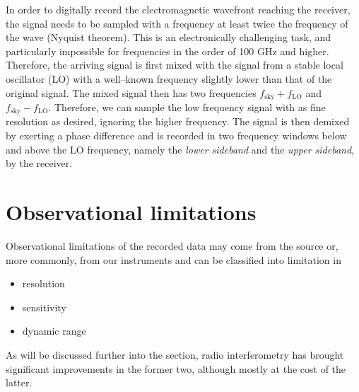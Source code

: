 \documentclass[a4wide,12pt]{book}
\begin{document}
{In order to digitally record the electromagnetic wavefront reaching the receiver, the signal needs to be sampled with a frequency at least twice the frequency of the wave (Nyquist theorem). This is an electronically challenging task, and particularly impossible for frequencies in the order of 100 GHz and higher. Therefore, the arriving signal is first mixed with the signal from a stable local oscillator (LO) with a well--known frequency slightly lower than that of the original signal. The mixed signal then has two frequencies $f_\mathrm{sky} + f_\mathrm{LO}$ and $f_\mathrm{sky} - f_\mathrm{LO}$. Therefore, we can sample the low frequency signal with as fine resolution as desired, ignoring the higher frequency. The signal is then demixed by exerting a phase difference and is recorded in two frequency windows below and above the LO frequency, namely the \emph{lower sideband} and the \emph{upper sideband}, by the receiver.

\section{Observational limitations}
Observational limitations of the recorded data may come from the source or, more commonly, from our instruments and can be classified into limitation in 
\begin{itemize}
\item resolution
\item sensitivity
\item dynamic range
\end{itemize}
As will be discussed further into the section, radio interferometry has brought significant improvements in the former two, although mostly at the cost of the latter.

}
\end{document}
